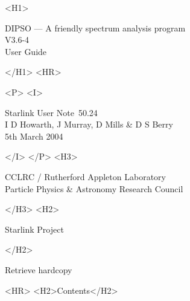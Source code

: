 \documentclass[twoside,11pt]{article}
\newcommand{\stardoccategory}  {Starlink User Note}
\newcommand{\stardocsource}    {sun\stardocnumber}
\newcommand{\stardocnumber} {50.24}
\newcommand{\stardocauthors} {I D Howarth, J Murray, D Mills \& D S Berry}
\newcommand{\stardocdate} {5th March 2004}
\newcommand{\stardoctitle} {DIPSO --- A friendly spectrum analysis program}
\newcommand{\stardocversion}   {V3.6-4}
\newcommand{\stardocmanual}    {User Guide}
\newcommand{\htmladdnormallink}[2]{#1}
\newcommand{\htmladdimg}[1]{}
\newcommand{\htmlref}[2]{#1}
\newcommand{\htmladdtonavigation}[1]{}
\newcommand{\xlabel}[1]{}
\renewcommand{\_}{\texttt{\symbol{95}}}
\begin{document}
\begin{htmlonly}
   \xlabel{}
   \begin{rawhtml} <H1> \end{rawhtml}
      \stardoctitle\\
      \stardocversion\\
      \stardocmanual
   \begin{rawhtml} </H1> <HR> \end{rawhtml}


   \begin{rawhtml} <P> <I> \end{rawhtml}
   \stardoccategory\ \stardocnumber \\
   \stardocauthors \\
   \stardocdate
   \begin{rawhtml} </I> </P> <H3> \end{rawhtml}
      \htmladdnormallink{CCLRC / Rutherford Appleton Laboratory}
                        {http://www.cclrc.ac.uk} \\
      \htmladdnormallink{Particle Physics \& Astronomy Research Council}
                        {http://www.pparc.ac.uk} \\
   \begin{rawhtml} </H3> <H2> \end{rawhtml}
      \htmladdnormallink{Starlink Project}{http://www.starlink.ac.uk/}
   \begin{rawhtml} </H2> \end{rawhtml}
   \htmladdnormallink{\htmladdimg{source.gif} Retrieve hardcopy}
      {http://www.starlink.ac.uk/cgi-bin/hcserver?\stardocsource}\\

  \label{stardoccontents}
  \begin{rawhtml} 
    <HR>
    <H2>Contents</H2>
  \end{rawhtml}
  \htmladdtonavigation{\htmlref{\htmladdimg{contents_motif.gif}}
        {stardoccontents}}

\end{htmlonly}
\end{document}
